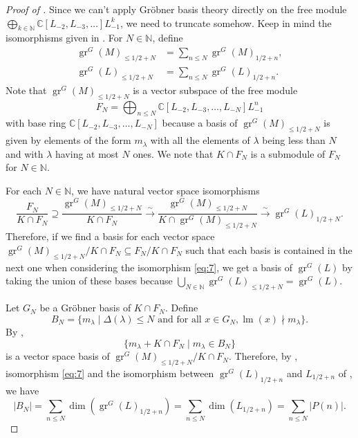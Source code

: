 \documentclass[12pt, a4paper]{article}
\theoremstyle{remark}
\DeclareMathOperator{\gr}{gr}
\DeclareMathOperator{\lm}{lm}
\begin{document}
\begin{proof}[Proof of ]
  Since we can't apply Gr\"{o}bner basis theory directly on the free module $\bigoplus_{k\in \mathbb{N}}\mathbb{C}[L_{-2},L_{-3},\dots]L_{-1}^k$, we need to truncate somehow.
  Keep in mind the isomorphisms given in .
  For $N \in \mathbb{N}$, define
  \begin{align*}
    \gr^G(M)_{\le 1/2 + N} &= \sum_{n \le N}\gr^G(M)_{1/2 + n}, \\
    \gr^G(L)_{\le 1/2 + N} &= \sum_{n \le N}\gr^G(L)_{1/2 + n}.
  \end{align*}
  Note that $\gr^G(M)_{\le 1/2 + N}$ is a vector subspace of the free module
  \begin{equation*}
    F_N = \bigoplus_{n \le N}\mathbb{C}[L_{-2}, L_{-3}, \dots, L_{-N}]L_{-1}^n
  \end{equation*}
  with base ring $\mathbb{C}[L_{-2}, L_{-3}, \dots, L_{-N}]$ because a basis of $\gr^G(M)_{\le 1/2 + N}$ is given by elements of the form $m_\lambda$ with all the elements of $\lambda$ being less than $N$ and with $\lambda$ having at most $N$ ones.
  We note that $K \cap F_N$ is a submodule of $F_N$ for $N \in \mathbb{N}$.
  
  For each $N \in \mathbb{N}$, we have natural vector space isomorphisms
  \begin{equation}
    \label{eq:7}
    \frac{F_N}{K \cap F_N} \supseteq \frac{\gr^G(M)_{\le 1/2 + N}}{K \cap F_N} \xrightarrow{\sim} \frac{\gr^G(M)_{\le 1/2 + N}}{K \cap \gr^G(M)_{\le 1/2 + N}} \xrightarrow{\sim} \gr^G(L)_{1/2 + N}.
  \end{equation}
  Therefore, if we find a basis for each vector space $\gr^G(M)_{\le 1/2 + N}/K \cap F_N \subseteq F_N/K \cap F_N$ such that each basis is contained in the next one when considering the isomorphism \eqref{eq:7}, we get a basis of $\gr^G(L)$ by taking the union of these bases because $\bigcup_{N \in \mathbb{N}}\gr^G(L)_{\le 1/2 + N} = \gr^G(L)$.
  
  Let $G_N$ be a Gr\"{o}bner basis of $K \cap F_N$.
  Define
  \begin{equation*}
    B_N = \{m_\lambda \mid \Delta(\lambda) \le N\text{ and for all }x \in G_N, \lm(x) \nmid m_\lambda\}.
  \end{equation*}
  By \cite[Proposition 3.6.4]{adams_introduction_1994},
  \begin{equation}
    \label{eq:8}
    \{m_\lambda + K \cap F_N \mid m_\lambda \in B_N\}
  \end{equation}
  is a vector space basis of $\gr^G(M)_{\le 1/2 + N}/K \cap F_N$.
  Therefore, by , isomorphism \eqref{eq:7} and the isomorphism between $\gr^G(L)_{1/2 + n}$ and $L_{1/2 + n}$ of , we have
  \begin{equation*}
    |B_N| = \sum_{n \le N}\dim(\gr^G(L)_{1/2 + n}) = \sum_{n \le N}\dim(L_{1/2 + n}) = \sum_{n \le N}|P(n)|.
  \end{equation*}
  

\end{proof}
\end{document}
